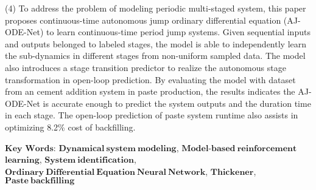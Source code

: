 (4) To address the problem of modeling periodic multi-staged system, this paper proposes continuous-time autonomous jump ordinary differential equation (AJ-ODE-Net) to learn continuous-time period jump systems.
Given sequential inputs and outputs belonged to labeled stages,
the model is able to independently learn the sub-dynamics in different stages from non-uniform sampled data. 
The model also introduces a stage transition predictor to realize the autonomous stage transformation in open-loop prediction. 
By evaluating the model with dataset from an cement  addition system in paste production, the results indicates the AJ-ODE-Net is accurate enough to predict the system outputs and the duration time in each stage.
The open-loop prediction of paste system runtime also assists in optimizing 8.2\% cost of backfilling.


\vskip 30bp
{
    $\mathbf{Key}$ $\mathbf{Words}$: 
    $\mathbf{Dynamical\ system\ modeling}$, 
    $\mathbf{Model}$-$\mathbf{based\ reinforcement}$
    $\mathbf{learning}$,
    $\mathbf{System\ identification}$, 
    $\mathbf{Ordinary\ Differential\ Equation\ Neural\ Network}$,
    $\mathbf{Thickener}$,
    $\mathbf{Paste\ backfilling}$
    
}


